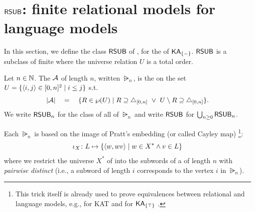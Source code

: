 


\section{$\mathsf{RSUB}$: finite relational models for language models}\label{section: relation}
In this section, we define the class $\mathsf{RSUB}$ of \emph{}, for the  of $\mathsf{KA}_{\{-\}}$.
$\mathsf{RSUB}$ is a subclass of finite  where the universe relation $U$ is a total order.
\begin{definition}\label{definition: relational bounded language model}
    Let $n \in \mathbb{N}$.
    The \intro*{} $\alg$ of length $n$, written $\rsub_{n}$, is the  on the set $U = \{\langle i,j\rangle \in [0, n]^2 \mid i \le j\}$ s.t.\ 
    \[\domain{\alg} \quad=\quad \set{\rel[1] \in \wp(U) \mid R \supseteq \triangle_{\range{0, n}} \ \lor \  U \setminus R \supseteq \triangle_{\range{0, n}}}.\]
    We write $\mathsf{RSUB}_{n}$ for the class of all \kl{valuations} of $\rsub_{n}$ and write $\mathsf{RSUB}$ for $\bigcup_{n \ge 0} \mathsf{RSUB}_{n}$.
    \lipicsEnd
\end{definition}
Each $\rsub_{n}$ is based on the image of Pratt's embedding (or called Cayley map) \cite{prattDynamicAlgebrasNature1980}\footnote{This trick itself is already used to prove equivalences between relational and language models, e.g., for KAT \cite{kozenKleeneAlgebraTests1996} and for $\mathsf{KA}_{\{\top\}}$ \cite{zhangIncorrectnessLogicKleene2022,pousCompletenessTheoremsKleene2022}.}:
\[\iota_{X} \colon L \mapsto \set{\tuple{\word[1], \word[1]\word[2]} \mid \word[1] \in X^{*} \land \word[2] \in L}\]
where we restrict the universe $X^*$ of \kl{words} into the subwords of a \kl{word} of length $n$ with \emph{pairwise distinct}  (i.e., a subword of length $i$ corresponds to the vertex $i$ in $\rsub_{n}$).

